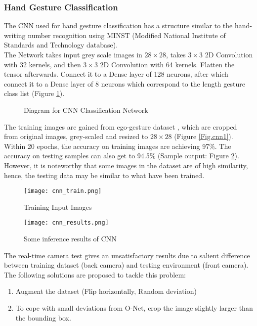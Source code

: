 \subsubsection{Hand Gesture Classification}

The CNN used for hand gesture classification has a structure similar to the hand-writing number recognition using MINST \cite{lecun-mnisthandwrittendigit-2010} (Modified National Institute of Standards and Technology database).\\[.2in]
The Network takes input grey scale images in $28\times28$, takes $3\times3$ 2D Convolution with 32 kernels, and then $3\times3$ 2D Convolution with 64 kernels. Flatten the tensor afterwards. Connect it to a Dense layer of 128 neurons, after which connect it to a Dense layer of 8 neurons which correspond to the length gesture class list (Figure \ref{Fig.cnn}).
\begin{figure}
\centering

\caption{Diagram for CNN Classification Network}
\label{Fig.cnn}
\end{figure}
The training images are gained from ego-gesture dataset \cite{ego}, which are cropped from original images, grey-scaled and resized to $28\times28$ (Figure \ref{Fig.cnn1}).\\[.2in]
Within 20 epochs, the accuracy on training images are achieving 97\%. The accuracy on testing samples can also get to 94.5\% (Sample output: Figure \ref{Fig.cnn2}). However, it is noteworthy that some images in the dataset are of high similarity, hence, the testing data may be similar to what have been trained.\\[.2in]
\begin{figure}
\centering
\texttt{[image: cnn\_train.png]}
\caption{Training Input Images} 
\label{Fig.cnn1}
\vspace{.4in}
\texttt{[image: cnn\_results.png]}
\caption{Some inference results of CNN} 
\label{Fig.cnn2}
\end{figure}
The real-time camera test gives an unsatisfactory results due to salient difference between training dataset (back camera) and testing environment (front camera). The following solutions are proposed to tackle this problem:
\begin{enumerate}
    \item Augment the dataset (Flip horizontally, Random deviation)
    \item To cope with small deviations from O-Net, crop the image slightly larger than the bounding box.
\end{enumerate}




